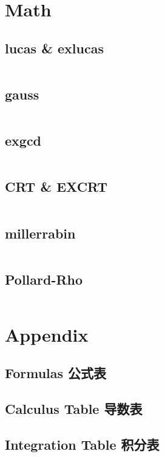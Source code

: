 \documentclass[titlepage, a4paper]{article}
\begin{document}
\begin{multicols}{2}
\begin{spacing}{0.6}
			\section{Math}
				\subsection{lucas \& exlucas}
					\inputminted{cpp}{src/Math Combinatorics/exlucas.cpp}
				\subsection{gauss}
					\inputminted{cpp}{src/Math Combinatorics/gauss.cpp}
				\subsection{exgcd}
					\inputminted{cpp}{src/Math Combinatorics/exgcd.cpp}
				\subsection{CRT \& EXCRT} 
					\inputminted{cpp}{src/Math Combinatorics/CRT.cpp}
				\subsection{millerrabin}
					\inputminted{cpp}{src/Math/millerrabin.cpp}
				\subsection{Pollard-Rho}
					\inputminted{cpp}{src/Math/pollard-rho.cpp}
			\section{Appendix}
				\begin{spacing}{0.5}
				\subsection{Formulas 公式表}
					
				\subsection{Calculus Table 导数表}
					
				\subsection{Integration Table 积分表}
					
				\end{spacing}

\end{spacing}
\end{multicols}
\end{document}
